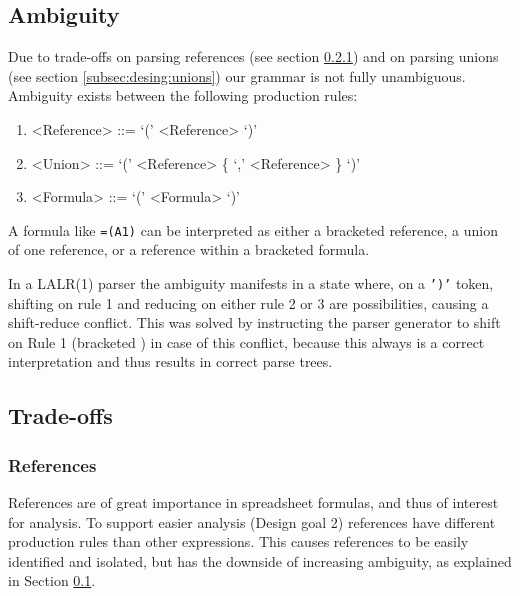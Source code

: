 \documentclass[conference]{IEEEtran}
\begin{document}
\subsection{Ambiguity}
\label{sec:ambiguity}

Due to trade-offs on parsing references (see section \ref{tradeoff:references}) and on parsing unions (see section \ref{subsec:desing:unions}) our grammar is not fully unambiguous.
Ambiguity exists between the following production rules:
\begin{enumerate}
\item \begin{grammar}<Reference> ::= `(' <Reference> `)'\end{grammar}
\item \begin{grammar}<Union> ::= `(' <Reference> \{ `,' <Reference> \} `)'\end{grammar}
\item \begin{grammar}<Formula> ::= `(' <Formula> `)'\end{grammar}
\end{enumerate}

A formula like \texttt{=(A1)} can be interpreted as either a bracketed reference, a union of one reference, or a reference within a bracketed formula.

In a LALR(1) parser the ambiguity manifests in a state where, on a \texttt{')'} token, shifting on rule 1 and reducing on either rule 2 or 3 are possibilities, causing a shift-reduce conflict.
This was solved by instructing the parser generator to shift on Rule 1 (bracketed ) in case of this conflict, because this always is a correct interpretation and thus results in correct parse trees.

\subsection{Trade-offs}

\subsubsection{\textbf{References}}
\label{tradeoff:references}

References are of great importance in spreadsheet formulas, and thus of interest for analysis.
To support easier analysis (Design goal 2) references have different production rules than other expressions.
This causes references to be easily identified and isolated, but has the downside of increasing ambiguity, as explained in Section \ref{sec:ambiguity}. 
\end{document}
